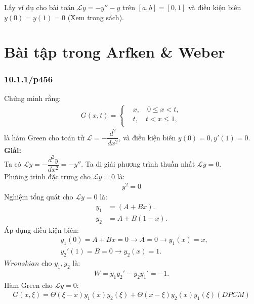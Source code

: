 \documentclass{report}
\begin{document}
Lấy ví dụ cho bài toán $\mathcal{L} y = -y'' - y$ trên $\left[a,b\right] = \left[0,1\right]$ và điều kiện biên $y(0) = y(1) = 0$ (Xem trong sách).

\newpage

\section{Bài tập trong Arfken \& Weber}


\subsubsection{10.1.1/p456}
Chứng minh rằng:
\begin{align*}
	G(x,t) =
	\begin{cases}
		 & x , \quad 0 \leq x < t, \\
		 & t , \quad t < x\leq 1 , \\
	\end{cases}
\end{align*}
là hàm Green cho toán tử $\mathcal{L} = -\dfrac{d^2}{dx^2}$, và điều kiện biên $y(0) = 0, y'(1) = 0$.\\

\textbf{Giải:}\\
Ta có $\mathcal{L} y = -\dfrac{d^2 y}{dx^2}  = -y''$. Ta đi giải phương trình thuần nhất $\mathcal{L} y = 0$.\\
Phương trình đặc trưng cho $\mathcal{L} y = 0$ là:
\begin{align*}
	y^2 = 0
\end{align*}
Nghiệm tổng quát cho $\mathcal{L} y = 0$ là:
\begin{align*}
	y_1 & = (A + Bx).     \\
	y_2 & = A + B(1-x). 
\end{align*}
Áp dụng điều kiện biên:
\begin{align*}
	 & y_1(0) = A + Bx = 0 \rightarrow A = 0 \rightarrow y_1(x) = x, \\
	 & y_{2}{'}(1) = B = 0 \rightarrow y_2(x) = 1.
\end{align*}
$Wronskian$ cho $y_1,y_2$ là:
\begin{align*}
	W = y_{1} y_{2}' - y_{2} y_{1}' = -1.
\end{align*}
Hàm Green cho $\mathcal{L} y = 0$:
\begin{align*}
	G(x,\xi)  = \Theta(\xi - x) y_1(x)y_2(\xi) + \Theta(x - \xi) y_2(x)y_1(\xi) (DPCM)
\end{align*}
\end{document}
